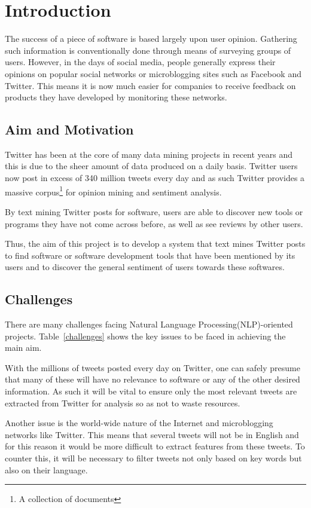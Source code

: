 \chapter{Introduction}
\label{cha:intro}
The success of a piece of software is based largely upon user opinion. Gathering such information is conventionally done through means of surveying groups of users. However, in the days of social media, people generally express their opinions on popular social networks or microblogging sites such as Facebook and Twitter. This means it is now much easier for companies to receive feedback on products they have developed by monitoring these networks.

\section{Aim and Motivation}
\label{sec:aim}
Twitter has been at the core of many data mining projects in recent years and this is due to the sheer amount of data produced on a daily basis. Twitter users now post in excess of 340 million tweets every day\cite{twitterblog} and as such Twitter provides a massive corpus\footnote{A collection of documents} for opinion mining and sentiment analysis.

By text mining Twitter posts for software, users are able to discover new tools or programs they have not come across before, as well as see reviews by other users.

Thus, the aim of this project is to develop a system that text mines Twitter posts to find software or software development tools that have been mentioned by its users and to discover the general sentiment of users towards these softwares.

\section{Challenges}
There are many challenges facing Natural Language Processing(NLP)-oriented projects. Table~\ref{challenges} shows the key issues to be faced in achieving the main aim.

With the millions of tweets posted every day on Twitter, one can safely presume that many of these will have no relevance to software or any of the other desired information. As such it will be vital to ensure only the most relevant tweets are extracted from Twitter for analysis so as not to waste resources.

Another issue is the world-wide nature of the Internet and microblogging networks like Twitter. This means that several tweets will not be in English and for this reason it would be more difficult to extract features from these tweets. To counter this, it will be necessary to filter tweets not only based on key words but also on their language.

